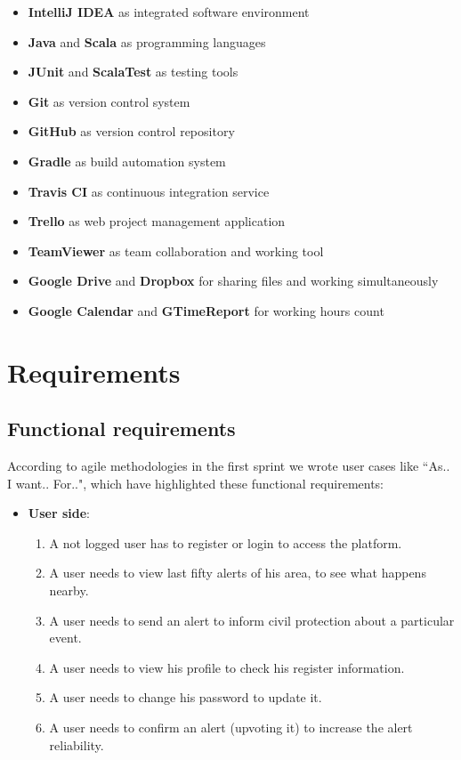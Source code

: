 \documentclass[a4paper,12pt]{report}
\begin{document}
\begin{itemize}
\item \textbf{IntelliJ IDEA} as integrated software environment
\item \textbf{Java} and \textbf{Scala} as programming languages
\item \textbf{JUnit} and \textbf{ScalaTest} as testing tools
\item \textbf{Git} as version control system
\item \textbf{GitHub} as version control repository
\item \textbf{Gradle} as build automation system
\item \textbf{Travis CI} as continuous integration service
\item \textbf{Trello} as web project management application
\item \textbf{TeamViewer} as team collaboration and working tool
\item \textbf{Google Drive} and \textbf{Dropbox} for sharing files and working simultaneously
\item \textbf{Google Calendar} and \textbf{GTimeReport} for working hours count
\end{itemize}


\chapter{Requirements}

\section{Functional requirements}

According to agile methodologies in the first sprint we wrote user cases like ``As.. I want.. For..", which have highlighted these functional requirements:

\begin{itemize}
\item \textbf{User side}:
\begin{enumerate}
\item A not logged user has to register or login to access the platform.
\item A user needs to view last fifty alerts of his area, to see what happens nearby.
\item A user needs to send an alert to inform civil protection about a particular event.
\item A user needs to view his profile to check his register information.
\item A user needs to change his password to update it.
\item A user needs to confirm an alert (upvoting it) to increase the alert reliability.
\end{enumerate}
\end{itemize}
\end{document}
